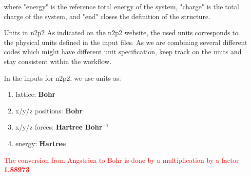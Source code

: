\documentclass[12pt]{article}
\newcommand\Warning{%
 \makebox[1.4em][c]{%
 \makebox[0pt][c]{\raisebox{.1em}{\small!}}%
 \makebox[0pt][c]{\color{red}\Large$\bigtriangleup$}}}%
\begin{document}
where "energy" is the reference total energy of the system, "charge" is the total charge of the system, and "end" closes the definition of the structure. 

\begin{mybox1}{Units in n2p2}
\Warning As indicated on the n2p2 website, the used units corresponds to the physical units defined in the input files. As we are combining several different codes which might have different unit specification, keep track on the units and stay consistent within the workflow.

In the inputs for n2p2, we use units as:
\begin{enumerate}
    \item lattice: \textbf{Bohr}
    \item x/y/z positions: \textbf{Bohr}
    \item x/y/z forces: \textbf{Hartree Bohr$^{-1}$}
    \item energy: \textbf{Hartree}
\end{enumerate}
\textcolor{red}{The conversion from Angström to Bohr is done by a multiplication by a factor \textbf{1.88973}}
\end{mybox1}
\end{document}
